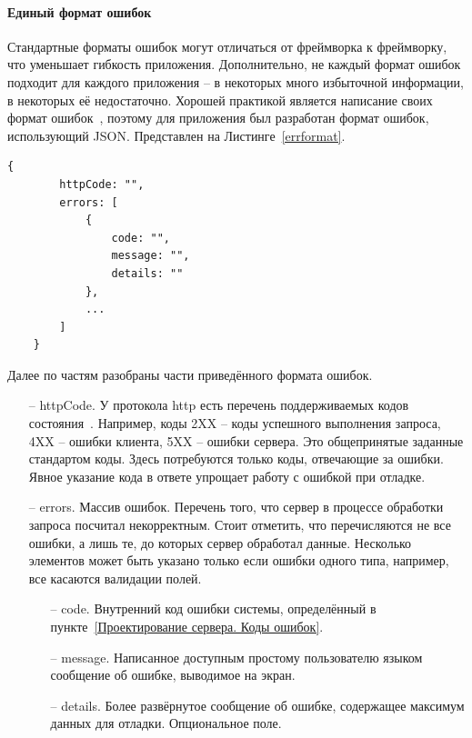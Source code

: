 \documentclass[a4paper,article]{article}
\begin{document}
\begin{sloppypar}
    \paragraph{Единый формат ошибок}\label{Единый формат ошибок}

    Стандартные форматы ошибок могут отличаться от фреймворка к фреймворку, что уменьшает гибкость приложения. Дополнительно, не каждый формат ошибок подходит для каждого приложения -- в некоторых много избыточной информации, в некоторых её недостаточно. Хорошей практикой является написание своих формат ошибок~\cite{httpadderrors}, поэтому для приложения был разработан формат ошибок, использующий JSON. Представлен на Листинге~\ref{errformat}.
    
    \newpage
    
    \begin{lstlisting}[label=errformat,caption=Формат ошибок]
    {
        httpCode: "",
        errors: [
            {
                code: "",
                message: "",
                details: ""
            },
            ...
        ]
    }
    \end{lstlisting}

    Далее по частям разобраны части приведённого формата ошибок.

    \begin{itemize}[nolistsep]
        \item[--] httpCode. У протокола http есть перечень поддерживаемых кодов состояния~\cite{httpstatus}. Например, коды 2XX -- коды успешного выполнения запроса, 4XX -- ошибки клиента, 5XX -- ошибки сервера. Это общепринятые заданные стандартом коды. Здесь потребуются только коды, отвечающие за ошибки. Явное указание кода в ответе упрощает работу с ошибкой при отладке.
        \item[--] errors. Массив ошибок. Перечень того, что сервер в процессе обработки запроса посчитал некорректным. Стоит отметить, что перечисляются не все ошибки, а лишь те, до которых сервер обработал данные. Несколько элементов может быть указано только если ошибки одного типа, например, все касаются валидации полей.
        \begin{itemize}[nolistsep]
            \item[--] code. Внутренний код ошибки системы, определённый в пункте~\ref{Проектирование сервера. Коды ошибок}.
            \item[--] message. Написанное доступным простому пользователю языком сообщение об ошибке, выводимое на экран.
            \item[--] details. Более развёрнутое сообщение об ошибке, содержащее максимум данных для отладки. Опциональное поле.
        \end{itemize}
    \end{itemize}


\end{sloppypar}
\end{document}
